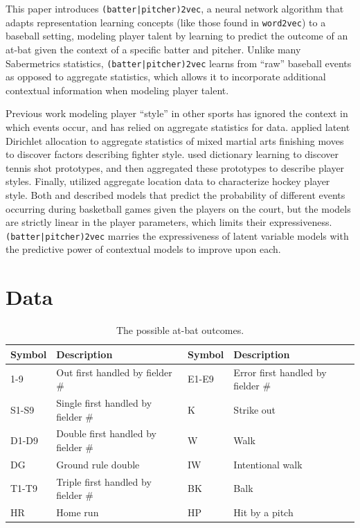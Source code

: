\documentclass{article}
\begin{document}
This paper introduces \texttt{(batter|pitcher)2vec}, a neural network algorithm that adapts representation learning concepts (like those found in \texttt{word2vec}) to a baseball setting, modeling player talent by learning to predict the outcome of an at-bat given the context of a specific batter and pitcher. Unlike many Sabermetrics statistics, \texttt{(batter|pitcher)2vec} learns from ``raw'' baseball events as opposed to aggregate statistics, which allows it to incorporate additional contextual information when modeling player talent.

Previous work modeling player ``style'' in other sports has ignored the context in which events occur, and has relied on aggregate statistics for data. \parencite{Hackett2017} applied latent Dirichlet allocation to aggregate statistics of mixed martial arts finishing moves to discover factors describing fighter style. \parencite{Wei2016} used dictionary learning to discover tennis shot prototypes, and then aggregated these prototypes to describe player styles. Finally, \parencite{Schulte2017} utilized aggregate location data to characterize hockey player style. Both \parencite{Oh2015} and \parencite{Kuehn2016} described models that predict the probability of different events occurring during basketball games given the players on the court, but the models are strictly linear in the player parameters, which limits their expressiveness. \texttt{(batter|pitcher)2vec} marries the expressiveness of latent variable models with the predictive power of contextual models to improve upon each.

\section{Data}
\label{data}

\begin{table}[h]
\caption{The possible at-bat outcomes.}
\centering
\begin{adjustbox}{max width=\textwidth}
    \begin{tabular}{ | l | l | l | l | }
    \hline
    Symbol & Description & Symbol & Description \\ 
    \hline\hline
    1-9 & Out first handled by fielder \# & E1-E9 & Error first handled by fielder \# \\
    \hline
    S1-S9 & Single first handled by fielder \# & K & Strike out \\
    \hline
    D1-D9 & Double first handled by fielder \# & W & Walk \\
    \hline
    DG & Ground rule double & IW & Intentional walk \\
    \hline
    T1-T9 & Triple first handled by fielder \# & BK & Balk \\
    \hline
    HR & Home run & HP & Hit by a pitch \\
    \hline
    \end{tabular}
\end{adjustbox}
\label{table:at_bats}
\end{table}
\end{document}
